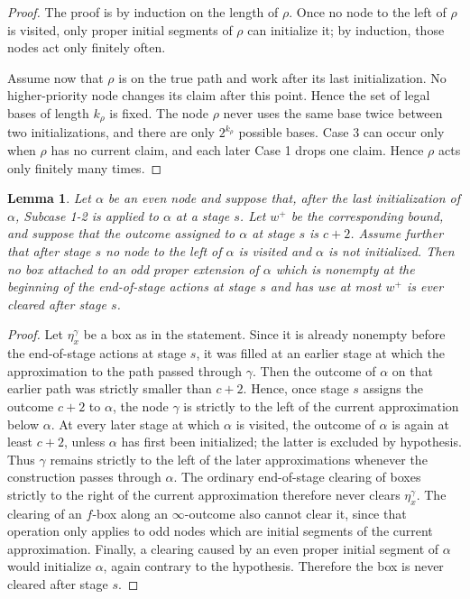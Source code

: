 \documentclass[10pt,a4paper]{amsart}
\newtheorem{lemma}[theorem]{Lemma}
\begin{document}
\begin{proof}
The proof is by induction on the length of $\rho$.  Once no node to
the left of $\rho$ is visited, only proper
initial segments of $\rho$ can initialize it; by induction, those nodes act
only finitely often.

Assume now that $\rho$ is on the true path and work after its last
initialization.  No higher-priority node changes its claim after this point.  Hence the set of legal bases of length
$k_\rho$ is fixed.  The node $\rho$ never uses the same base twice between two
initializations, and there are only $2^{k_\rho}$ possible bases.  Case 3 can
occur only when $\rho$ has no current claim, and each later Case 1 drops one
claim.  Hence $\rho$ acts only finitely many times.
\end{proof}


\begin{lemma}\label{extension-jump-main}
Let $\alpha$ be an even node and suppose that, after the last initialization of
$\alpha$, Subcase 1-2 is applied to $\alpha$ at a stage $s$.  Let
$w^+$ be the corresponding bound, and suppose that the outcome assigned to
$\alpha$ at stage $s$ is $c+2$.  Assume further that after stage $s$ no node to
the left of $\alpha$ is visited and $\alpha$ is not initialized.  Then no box
attached to an odd proper extension of $\alpha$ which is nonempty at the
beginning of the end-of-stage actions at stage $s$ and has use at most $w^+$ is
ever cleared after stage $s$.
\end{lemma}

\begin{proof}
Let $\eta_x^\gamma$ be a box as in the statement.  Since it is already nonempty
before the end-of-stage actions at stage $s$, it was filled at an earlier stage
at which the approximation to the path passed through $\gamma$. Then the outcome of $\alpha$ on that earlier path
was strictly smaller than $c+2$.  Hence, once stage $s$ assigns the outcome
$c+2$ to $\alpha$, the node $\gamma$ is strictly to the left of the current
approximation below $\alpha$.
At every later stage at which $\alpha$ is visited, the outcome of $\alpha$ is
again at least $c+2$, unless $\alpha$ has first been initialized; the latter is
excluded by hypothesis.  Thus $\gamma$ remains strictly to the left of the later
approximations whenever the construction passes through $\alpha$.  The ordinary
end-of-stage clearing of boxes strictly to the right of the current
approximation therefore never clears $\eta_x^\gamma$.  The clearing of an
$f$-box along an $\infty$-outcome also cannot clear it, since that operation
only applies to odd nodes which are initial segments of the current
approximation.
Finally, a clearing caused by an even proper initial segment of $\alpha$ would
initialize $\alpha$, again contrary to the hypothesis.  Therefore the box is
never cleared after stage $s$.
\end{proof}
\end{document}
